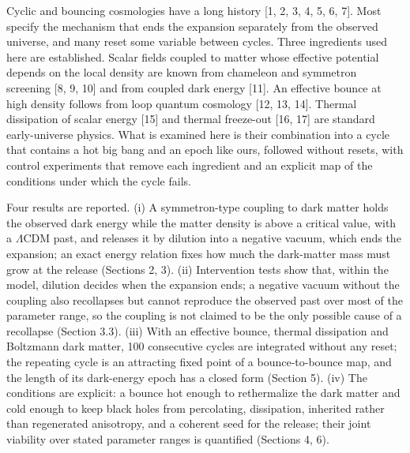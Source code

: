 \documentclass[pdflatex,sn-mathphys-num]{sn-jnl}
\begin{document}
Cyclic and bouncing cosmologies have a long history [1, 2, 3, 4, 5, 6, 7]. Most specify the mechanism that ends the expansion separately from the observed universe, and many reset some variable between cycles. Three ingredients used here are established. Scalar fields coupled to matter whose effective potential depends on the local density are known from chameleon and symmetron screening [8, 9, 10] and from coupled dark energy [11]. An effective bounce at high density follows from loop quantum cosmology [12, 13, 14]. Thermal dissipation of scalar energy [15] and thermal freeze-out [16, 17] are standard early-universe physics. What is examined here is their combination into a cycle that contains a hot big bang and an epoch like ours, followed without resets, with control experiments that remove each ingredient and an explicit map of the conditions under which the cycle fails.

Four results are reported. (i) A symmetron-type coupling to dark matter holds the observed dark energy while the matter density is above a critical value, with a $\Lambda$CDM past, and releases it by dilution into a negative vacuum, which ends the expansion; an exact energy relation fixes how much the dark-matter mass must grow at the release (Sections 2, 3). (ii) Intervention tests show that, within the model, dilution decides when the expansion ends; a negative vacuum without the coupling also recollapses but cannot reproduce the observed past over most of the parameter range, so the coupling is not claimed to be the only possible cause of a recollapse (Section 3.3). (iii) With an effective bounce, thermal dissipation and Boltzmann dark matter, 100 consecutive cycles are integrated without any reset; the repeating cycle is an attracting fixed point of a bounce-to-bounce map, and the length of its dark-energy epoch has a closed form (Section 5). (iv) The conditions are explicit: a bounce hot enough to rethermalize the dark matter and cold enough to keep black holes from percolating, dissipation, inherited rather than regenerated anisotropy, and a coherent seed for the release; their joint viability over stated parameter ranges is quantified (Sections 4, 6).
\end{document}
